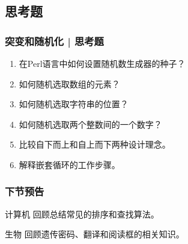 \subsection{思考题}
\begin{frame}
  \frametitle{突变和随机化 | 思考题}
  \begin{enumerate}
    \item 在Perl语言中如何设置随机数生成器的种子？
    \item 如何随机选取数组的元素？
    \item 如何随机选取字符串的位置？
    \item 如何随机选取两个整数间的一个数字？
    \item 比较自下而上和自上而下两种设计理念。
    \item 解释嵌套循环的工作步骤。
  \end{enumerate}
\end{frame}

\begin{frame}
  \frametitle{下节预告}
  \begin{block}{计算机}
    回顾总结常见的排序和查找算法。
  \end{block}
  \begin{block}{生物}
    回顾遗传密码、翻译和阅读框的相关知识。
  \end{block}
\end{frame}



